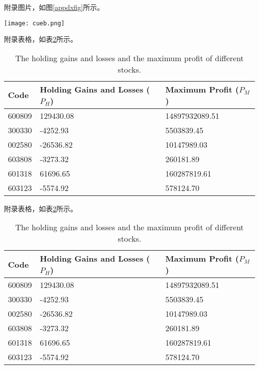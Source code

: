 \begin{appendix}
\renewcommand{\thetable}{A.\arabic{table}}
\renewcommand{\thefigure}{A.\arabic{figure}}

附录图片，如图\ref{appdxfig}所示。
\begin{figure*}[htb]
\centering
\texttt{[image: cueb.png]}
\caption{插图样例}
\label{appdxfig}
\end{figure*}

附录表格，如表\ref{appdxtab}所示。
\begin{table}[htp]
\small
\centering
\setlength{\abovecaptionskip}{12pt}
\setlength{\belowcaptionskip}{6pt}
\caption{The holding gains and losses and the maximum profit of different stocks.}
\begin{tabular}{p{3cm}p{5cm}p{5cm}}\toprule[1.5pt]
Code& Holding Gains and Losses ($P_{H}$)& Maximum Profit ($P_{M}$)\\\midrule[1pt]
600809& 129430.08 & 14897932089.51 \\
300330& -4252.93 & 5503839.45 \\
002580& -26536.82 & 10147989.03 \\
603808& -3273.32 & 260181.89 \\
601318& 61696.65 & 160287819.61 \\
603123& -5574.92 & 578124.70\\
\bottomrule[1.5pt]
\end{tabular}
\label{appdxtab}
\end{table}

附录表格，如表\ref{appdxtab}所示。
\begin{table}[htp]
\small
\centering
\setlength{\abovecaptionskip}{12pt}
\setlength{\belowcaptionskip}{6pt}
\caption{The holding gains and losses and the maximum profit of different stocks.}
\begin{tabular}{p{3cm}p{5cm}p{5cm}}\toprule[1.5pt]
Code& Holding Gains and Losses ($P_{H}$)& Maximum Profit ($P_{M}$)\\\midrule[1pt]
600809& 129430.08 & 14897932089.51 \\
300330& -4252.93 & 5503839.45 \\
002580& -26536.82 & 10147989.03 \\
603808& -3273.32 & 260181.89 \\
601318& 61696.65 & 160287819.61 \\
603123& -5574.92 & 578124.70\\
\bottomrule[1.5pt]
\end{tabular}
\label{appdxtab}
\end{table}


\end{appendix}

